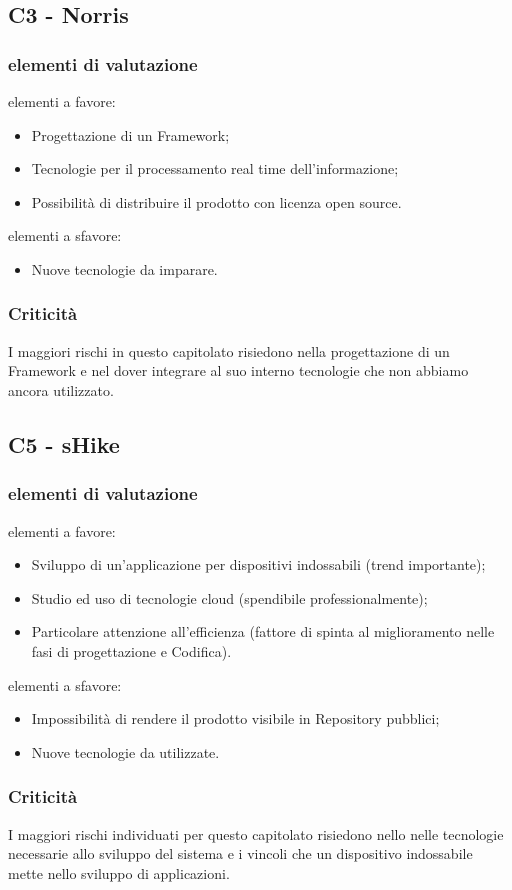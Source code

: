 \subsection{C3 - Norris}{
	\subsubsection{elementi di valutazione}{
		elementi a favore:
		\begin{itemize}
			\item Progettazione di un Framework;
			\item Tecnologie per il processamento real time dell'informazione;
			\item Possibilità di distribuire il prodotto con licenza open source.
		\end{itemize}
		
		elementi a sfavore:
		\begin{itemize}
			\item Nuove tecnologie da imparare.
		\end{itemize}
	}
	\subsubsection{Criticità}{
		I maggiori rischi in questo capitolato risiedono nella progettazione di un Framework e nel dover integrare al suo interno tecnologie che non abbiamo ancora utilizzato.
	}
}

\subsection{C5 - sHike}{
	\subsubsection{elementi di valutazione}{
		elementi a favore:
		\begin{itemize}
			\item Sviluppo di un'applicazione per dispositivi indossabili (trend importante);
			\item Studio ed uso di tecnologie cloud (spendibile professionalmente);
			\item Particolare attenzione all'efficienza (fattore di spinta al miglioramento nelle fasi di progettazione e Codifica).
		\end{itemize}
		
		elementi a sfavore:
		\begin{itemize}
			\item Impossibilità di rendere il prodotto visibile in Repository pubblici;
			\item Nuove tecnologie da utilizzate.
		\end{itemize}
	}
	\subsubsection{Criticità}{
		I maggiori rischi individuati per questo capitolato risiedono nello nelle tecnologie necessarie allo sviluppo del sistema e i vincoli che un dispositivo indossabile mette nello sviluppo di applicazioni. 
	}
}